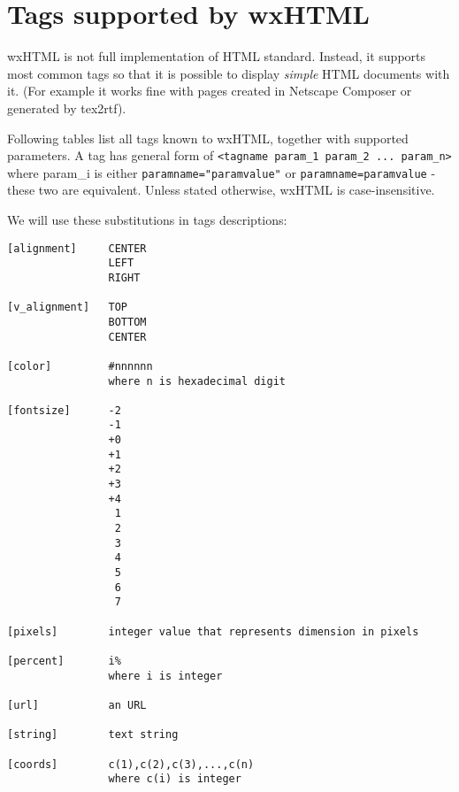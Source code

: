 \section{Tags supported by wxHTML}\label{htmltagssupported}

wxHTML is not full implementation of HTML standard. Instead, it supports most common tags so that it 
is possible to display {\it simple} HTML documents with it. (For example it works fine with pages created
in Netscape Composer or generated by tex2rtf).

Following tables list all tags known to wxHTML, together with supported parameters.
A tag has general form of {\tt <tagname param\_1 param\_2 ... param\_n>} where param\_i is
either {\tt paramname="paramvalue"} or {\tt paramname=paramvalue} - these two are equivalent. Unless stated 
otherwise, wxHTML is case-insensitive.



We will use these substitutions in tags descriptions:

\begin{verbatim}
[alignment]     CENTER
                LEFT
                RIGHT

[v_alignment]   TOP
                BOTTOM
                CENTER
                
[color]         #nnnnnn
                where n is hexadecimal digit

[fontsize]      -2
                -1
                +0
                +1
                +2
                +3
                +4
                 1
                 2
                 3
                 4
                 5
                 6
                 7

[pixels]        integer value that represents dimension in pixels

[percent]       i% 
                where i is integer

[url]           an URL 

[string]        text string

[coords]        c(1),c(2),c(3),...,c(n)
                where c(i) is integer

\end{verbatim}



